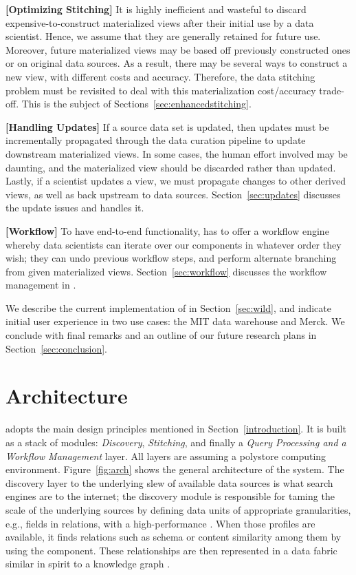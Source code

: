 {\bf [Optimizing Stitching]} It is highly inefficient and wasteful to  discard expensive-to-construct materialized views after their initial use by a data scientist.  Hence, we assume that they are generally retained for future use.  Moreover, future materialized views  may be based off previously constructed ones or on original data sources.  As a result, there may be several ways to construct a new view, with different  costs and accuracy. Therefore, the data stitching problem must be revisited to deal with this materialization cost/accuracy trade-off.  This is the subject of Sections~\ref{sec:enhancedstitching}.

{\bf [Handling Updates]}  If a source data set is updated, then
updates must be incrementally propagated through the data curation pipeline to
update downstream materialized views.  In some cases, the human effort involved may be
daunting, and the materialized view should be discarded rather than updated.  Lastly, if a
scientist updates a view, we must propagate changes to other derived views, as well as back upstream to data sources. Section~\ref{sec:updates} discusses the update issues and \dcv handles it.

{\bf [Workflow]} To have end-to-end functionality, \dcv has to offer a workflow engine whereby data scientists can iterate over our components in whatever order they wish; they can  undo previous workflow steps, and perform alternate branching from given materialized views. Section~\ref{sec:workflow} discusses the  workflow management in \dcv.

We describe the  current implementation of \dcv  in Section~\ref{sec:wild}, and indicate initial user experience in two use cases: the  MIT data warehouse and Merck. We conclude with final remarks and an  outline of  our future research plans in Section~\ref{sec:conclusion}.


\section{Architecture}
\label{sec:arch}

\dcv adopts the main design principles mentioned in Section~\ref{introduction}. 
It is built as a stack of modules: {\em Discovery}, {\em Stitching}, and finally 
a {\em Query Processing and a Workflow Management} layer. All layers are assuming a polystore computing environment. Figure~\ref{fig:arch} shows the
general architecture of the \dcv system. The discovery layer to the underlying
slew of available data sources is what search engines are to the
internet; the discovery module is responsible for taming the scale of the underlying
sources by defining data units of appropriate granularities, e.g., fields in
relations, with a high-performance . When those profiles are
available, it finds relations such as schema or content similarity among them by
using the  component. These relationships are then
represented in a data fabric similar in spirit to a knowledge graph
\cite{DBLP:conf/semweb/AuerBKLCI07,DBLP:conf/sigmod/BollackerEPST08,DBLP:conf/www/SuchanekKW07}.

